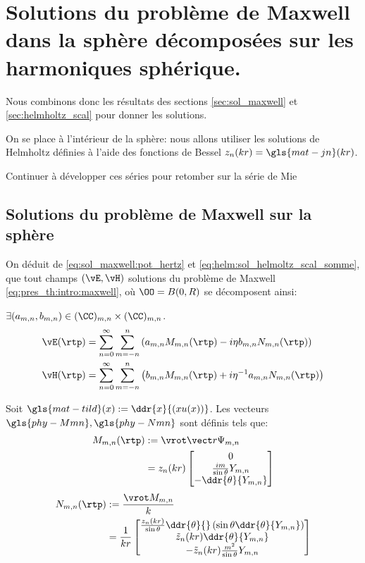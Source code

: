 \section{Solutions du problème de Maxwell dans la sphère décomposées sur les harmoniques sphérique.}\label{sec:maxwell_harmonique}

Nous combinons donc les résultats des sections \ref{sec:sol_maxwell} et \ref{sec:helmholtz_scal} pour donner les solutions.

On se place à l'intérieur de la sphère: nous allons utiliser les solutions de Helmholtz définies à l'aide des fonctions de Bessel \(z_n(kr) = \gls{mat-jn}(kr)\).


\begin{REM}
  Continuer à développer ces séries pour retomber sur la série de Mie
\end{REM}

\subsection{Solutions du problème de Maxwell sur la sphère}
On déduit de  \eqref{eq:sol_maxwell:pot_hertz} et \eqref{eq:helm:sol_helmoltz_scal_somme}, que tout champs \((\vE,\vH)\) solutions du problème de Maxwell \eqref{eq:pres_th:intro:maxwell}, où \(\OO = B(0,R)\) se décomposent ainsi:

\(\exists (a_{m,n},b_{m,n}) \in (\CC)_{m,n}\times (\CC)_{m,n}\).
\begin{align*}
  \vE(\rtp) &= \sum\limits_{n=0}^\infty\sum\limits_{m=-n}^n\left( a_{m,n}   M_{m,n}(\rtp) - i \eta b_{m,n} N_{m,n}(\rtp)\right)\\
  \vH(\rtp) &= \sum\limits_{n=0}^\infty\sum\limits_{m=-n}^n\left( b_{m,n}   M_{m,n}(\rtp) + i {\eta}^{-1} a_{m,n} N_{m,n}(\rtp)\right)
\end{align*}

Soit \(\gls{mat-tild}(x) := \ddr{x}{\left(xu(x)\right)}\). Les vecteurs \(\gls{phy-Mmn} ,\gls{phy-Nmn}\) sont définis tels que:
\begin{align}
  M_{m,n}(\rtp) &:= \vrot \vect r \Psi_{m,n} \\
  &= z_n(kr)
  \begin{bmatrix}
    0 \\ \frac{im}{\sin\theta}Y_{m,n}\\
    - \ddr{\theta}{Y_{m,n}}
  \end{bmatrix}
\end{align}
\begin{align}
  N_{m,n}(\rtp) &:= \frac{\vrot M_{m,n}}{k} \\
  &= \frac{1}{kr}\begin{bmatrix}
    \frac{z_n(kr)}{\sin\theta}\ddr{\theta}{}\left(\sin\theta\ddr{\theta}{Y_{m,n}}\right)\\
    \tilde z_n(kr)\ddr{\theta}{Y_{m,n}}\\
    -\tilde z_n(kr)\frac{m^2}{\sin\theta}Y_{m,n}\\
  \end{bmatrix}
\end{align}


